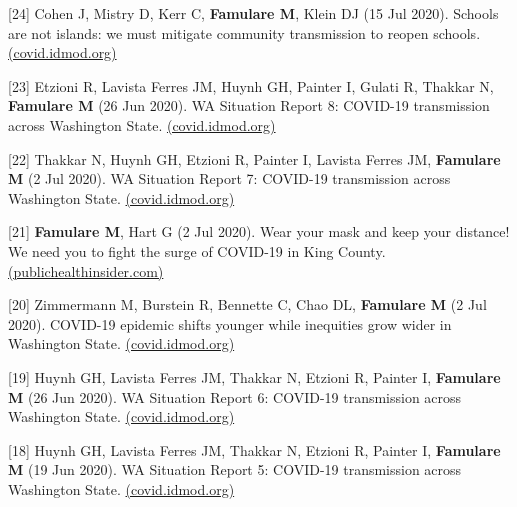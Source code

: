 \documentclass{article}
\begin{document}
\begin{llist}
\begin{items}
	
	\item[{[24]}] Cohen J, Mistry D, Kerr C, \textbf{Famulare M}, Klein DJ (15 Jul 2020). Schools are not islands: we must mitigate community transmission to reopen schools.  \href{https://iazpvnewgrp01.blob.core.windows.net/source/2021-02/reports/pdf/Schools_are_not_islands_we_must_mitigate_community_transmission_to_reopen_schools.pdf}{(covid.idmod.org)}
	
	\item[{[23]}] Etzioni R, Lavista Ferres JM, Huynh GH, Painter I, Gulati R, Thakkar N, \textbf{Famulare M} (26 Jun 2020). WA Situation Report 8: COVID-19 transmission across Washington State. \href{https://iazpvnewgrp01.blob.core.windows.net/source/2021-02/reports/pdf/WA_Situation_Report_8_COVID-19_transmission_across_Washington_State.pdf}{(covid.idmod.org)} 
	
	\item[{[22]}] Thakkar N, Huynh GH, Etzioni R, Painter I, Lavista Ferres JM, \textbf{Famulare M} (2 Jul 2020). WA Situation Report 7: COVID-19 transmission across Washington State. \href{https://iazpvnewgrp01.blob.core.windows.net/source/2021-02/reports/pdf/WA_Situation_Report_7_COVID-19_transmission_across_Washington_State.pdf}{(covid.idmod.org)} 
	
	\item[{[21]}] \textbf{Famulare M}, Hart G (2 Jul 2020). Wear your mask and keep your distance! We need you to fight the surge of COVID-19 in King County. \href{https://publichealthinsider.com/2020/07/02/wear-your-mask-and-keep-your-distance-we-need-you-to-fight-the-surge-of-covid-19-in-king-county/}{(publichealthinsider.com)}
	
	\item[{[20]}] Zimmermann M, Burstein R, Bennette C, Chao DL, \textbf{Famulare M} (2 Jul 2020). COVID-19 epidemic shifts younger while inequities grow wider in Washington State. \href{https://iazpvnewgrp01.blob.core.windows.net/source/2021-02/reports/pdf/Inequities_in_COVID-19_dynamics.pdf}{(covid.idmod.org)}
	
	\item[{[19]}] Huynh GH, Lavista Ferres JM, Thakkar N, Etzioni R, Painter I, \textbf{Famulare M} (26 Jun 2020). WA Situation Report 6: COVID-19 transmission across Washington State. \href{https://iazpvnewgrp01.blob.core.windows.net/source/2021-02/reports/pdf/WA_Situation_Report_6_COVID-19_transmission_across_Washington_State.pdf}{(covid.idmod.org)} 
	
	\item[{[18]}] Huynh GH, Lavista Ferres JM, Thakkar N, Etzioni R, Painter I, \textbf{Famulare M} (19 Jun 2020). WA Situation Report 5: COVID-19 transmission across Washington State. \href{https://iazpvnewgrp01.blob.core.windows.net/source/2021-02/reports/pdf/WA_Situation_Report_5_COVID-19_transmission_across_Washington_State.pdf}{(covid.idmod.org)} 
	

\end{items}
\end{llist}
\end{document}
